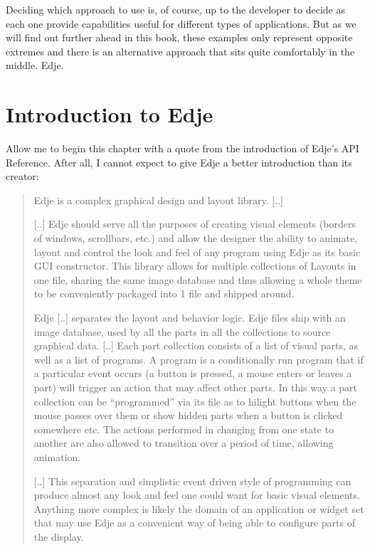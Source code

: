 \documentclass[12pt,a4paper,english]{book}
\begin{document}
Deciding which approach to use is, of course, up to the developer to decide as
each one provide capabilities useful for different types of applications. But
as we will find out further ahead in this book, these examples only represent
opposite extremes and there is an alternative approach that sits quite
comfortably in the middle. Edje.



\hypertarget{introduction-to-edje}{}
\chapter{Introduction to Edje}
\label{introduction-to-edje}

Allow me to begin this chapter with a quote from the introduction of Edje's API
Reference. After all, I cannot expect to give Edje a better introduction than
its creator:
\begin{quote}

Edje is a complex graphical design and layout library. {[}..{]}

{[}..{]} Edje should serve all the purposes of creating visual elements
(borders of windows, scrollbars, etc.) and allow the designer the ability
to animate, layout and control the look and feel of any program using Edje
as its basic GUI constructor. This library allows for multiple collections
of Layouts in one file, sharing the same image database and thus allowing a
whole theme to be conveniently packaged into 1 file and shipped around.

Edje {[}..{]} separates the layout and behavior logic. Edje files ship with an
image database, used by all the parts in all the collections to source
graphical data. {[}..{]} Each part collection consists of a list of visual
parts, as well as a list of programs. A program is a conditionally run
program that if a particular event occurs (a button is pressed, a mouse
enters or leaves a part) will trigger an action that may affect other
parts. In this way a part collection can be ``programmed'' via its file as to
hilight buttons when the mouse passes over them or show hidden parts when a
button is clicked somewhere etc. The actions performed in changing from one
state to another are also allowed to transition over a period of time,
allowing animation.

{[}..{]} This separation and simplistic event driven style of programming can
produce almost any look and feel one could want for basic visual elements.
Anything more complex is likely the domain of an application or widget set
that may use Edje as a convenient way of being able to configure parts of
the display.
\end{quote}
\end{document}

